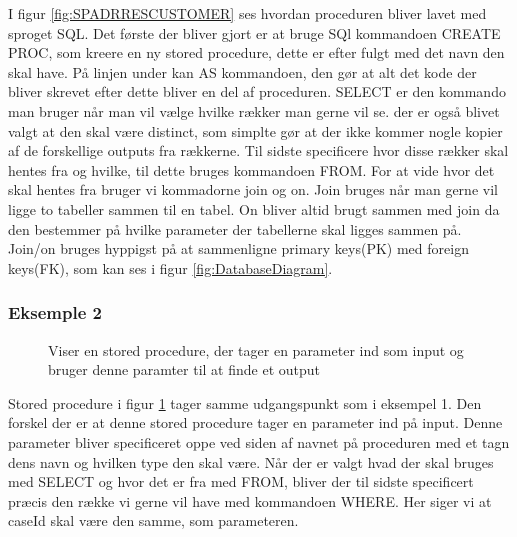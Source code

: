 I figur \ref{fig:SPADRRESCUSTOMER} ses hvordan proceduren bliver lavet med sproget SQL. Det første der bliver gjort er at bruge SQl kommandoen CREATE PROC, som kreere en ny stored procedure, dette er efter fulgt med det navn den skal have.
På linjen under kan AS kommandoen, den gør at alt det kode der bliver skrevet efter dette bliver en del af proceduren.
SELECT er den kommando man bruger når man vil vælge hvilke rækker man gerne vil se. der er også blivet valgt at den skal være distinct, som simplte gør at der ikke kommer nogle kopier af de forskellige outputs fra rækkerne.
Til sidste specificere hvor disse rækker skal hentes fra og hvilke, til dette bruges kommandoen FROM. For at vide hvor det skal hentes fra bruger vi kommadorne join og on. Join bruges når man gerne vil ligge to tabeller sammen til en tabel. On bliver altid brugt sammen med join da den bestemmer på hvilke parameter der tabellerne skal ligges sammen på. Join/on bruges hyppigst på at sammenligne primary keys(PK) med foreign keys(FK), som kan ses i figur \ref{fig:DatabaseDiagram}.

\subsubsection{Eksemple 2}
\begin{figure}[H]
    \caption{Viser en stored procedure, der tager en parameter ind som input og bruger denne paramter til at finde et output}
    \label{fig:SPWORKTYPE}
\end{figure}

Stored procedure i figur \ref{fig:SPWORKTYPE} tager samme udgangspunkt som i eksempel 1.
Den forskel der er at denne stored procedure tager en parameter ind på input. Denne parameter bliver specificeret oppe ved siden af navnet på proceduren med et \@ tagn dens navn og hvilken type den skal være. Når der er valgt hvad der skal bruges med SELECT og hvor det er fra med FROM, bliver der til sidste specificert præcis den række vi gerne vil have med kommandoen WHERE. Her siger vi at caseId skal være den samme, som parameteren.

